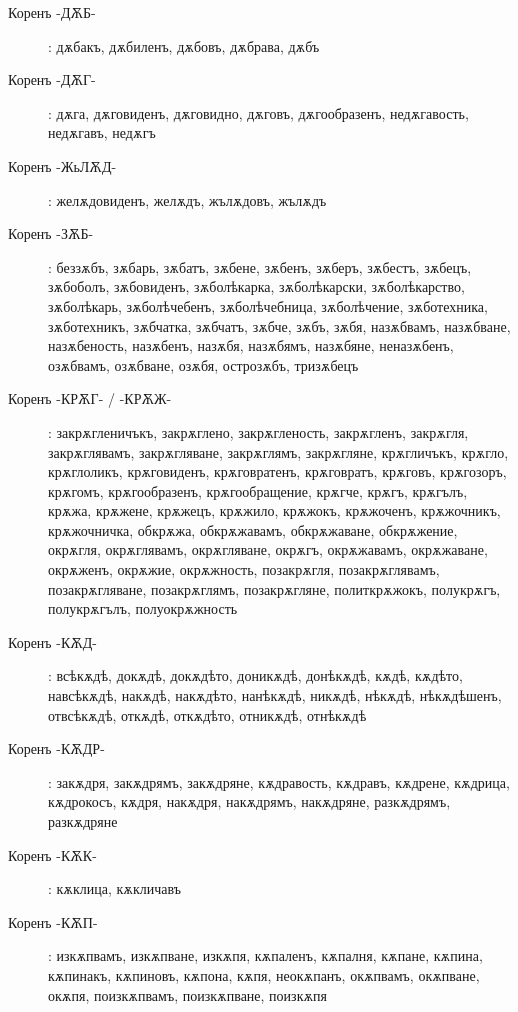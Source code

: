 \documentclass{article}
\begin{document}
\begin{description}
	\item[Коренъ -ДѪБ-]: дѫбакъ, дѫбиленъ, дѫбовъ, дѫбрава, дѫбъ
	
	\item[Коренъ -ДѪГ-]: дѫга, дѫговиденъ, дѫговидно, дѫговъ, дѫгообразенъ, недѫгавость, недѫгавъ, недѫгъ
	
	\item[Коренъ -ЖьЛѪД-]: желѫдовиденъ, желѫдъ, жълѫдовъ, жълѫдъ
	
	\item[Коренъ -ЗѪБ-]: беззѫбъ, зѫбарь, зѫбатъ, зѫбене, зѫбенъ, зѫберъ, зѫбестъ, зѫбецъ, зѫбоболъ, зѫбовиденъ, зѫболѣкарка, зѫболѣкарски, зѫболѣкарство, зѫболѣкарь, зѫболѣчебенъ, зѫболѣчебница, зѫболѣчение, зѫботехника, зѫботехникъ, зѫбчатка, зѫбчатъ, зѫбче, зѫбъ, зѫбя, назѫбвамъ, назѫбване, назѫбеность, назѫбенъ, назѫбя, назѫбямъ, назѫбяне, неназѫбенъ, озѫбвамъ, озѫбване, озѫбя, острозѫбъ, тризѫбецъ
	
	\item[Коренъ -КРѪГ- / -КРѪЖ-]: закрѫгленичъкъ, закрѫглено, закрѫгленость, закрѫгленъ, закрѫгля, закрѫглявамъ, закрѫгляване, закрѫглямъ, закрѫгляне, крѫгличъкъ, крѫгло, крѫглоликъ, крѫговиденъ, крѫговратенъ, крѫговратъ, крѫговъ, крѫгозоръ, крѫгомъ, крѫгообразенъ, крѫгообращение, крѫгче, крѫгъ, крѫгълъ, крѫжа, крѫжене, крѫжецъ, крѫжило, крѫжокъ, крѫжоченъ, крѫжочникъ, крѫжочничка, обкрѫжа, обкрѫжавамъ, обкрѫжаване, обкрѫжение, окрѫгля, окрѫглявамъ, окрѫгляване, окрѫгъ, окрѫжавамъ, окрѫжаване, окрѫженъ, окрѫжие, окрѫжность, позакрѫгля, позакрѫглявамъ, позакрѫгляване, позакрѫглямъ, позакрѫгляне, политкрѫжокъ, полукрѫгъ, полукрѫгълъ, полуокрѫжность
	
	\item[Коренъ -КѪД-]: всѣкѫдѣ, докѫдѣ, докѫдѣто, доникѫдѣ, донѣкѫдѣ, кѫдѣ, кѫдѣто, навсѣкѫдѣ, накѫдѣ, накѫдѣто, нанѣкѫдѣ, никѫдѣ, нѣкѫдѣ, нѣкѫдѣшенъ, отвсѣкѫдѣ, откѫдѣ, откѫдѣто, отникѫдѣ, отнѣкѫдѣ
	
	\item[Коренъ -КѪДР-]: закѫдря, закѫдрямъ, закѫдряне, кѫдравость, кѫдравъ, кѫдрене, кѫдрица, кѫдрокосъ, кѫдря, накѫдря, накѫдрямъ, накѫдряне, разкѫдрямъ, разкѫдряне
	\item[Коренъ -КѪК-]: кѫклица, кѫкличавъ
	
	\item[Коренъ -КѪП-]: изкѫпвамъ, изкѫпване, изкѫпя, кѫпаленъ, кѫпалня, кѫпане, кѫпина, кѫпинакъ, кѫпиновъ, кѫпона, кѫпя, неокѫпанъ, окѫпвамъ, окѫпване, окѫпя, поизкѫпвамъ, поизкѫпване, поизкѫпя
	

\end{description}
\end{document}
